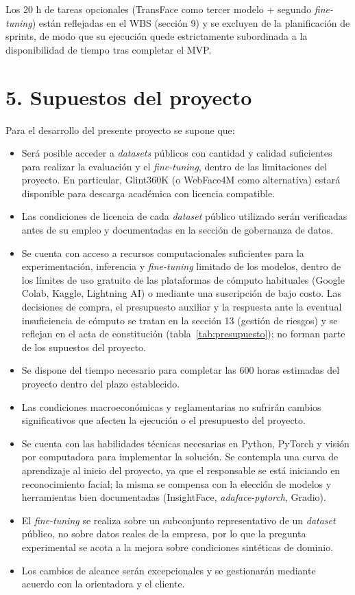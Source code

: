 \documentclass[
  11pt, %
]{charter}
\begin{document}
Los 20 h de tareas opcionales (TransFace como tercer modelo + segundo \textit{fine-tuning}) están reflejadas en el WBS (sección 9) y se excluyen de la planificación de sprints, de modo que su ejecución quede estrictamente subordinada a la disponibilidad de tiempo tras completar el MVP.

\section{5. Supuestos del proyecto}
\label{sec:supuestos}

Para el desarrollo del presente proyecto se supone que:

\begin{itemize}
  \item Será posible acceder a \textit{datasets} públicos con cantidad y calidad suficientes para realizar la evaluación y el \textit{fine-tuning}, dentro de las limitaciones del proyecto. En particular, Glint360K (o WebFace4M como alternativa) estará disponible para descarga académica con licencia compatible.
  \item Las condiciones de licencia de cada \textit{dataset} público utilizado serán verificadas antes de su empleo y documentadas en la sección de gobernanza de datos.
  \item Se cuenta con acceso a recursos computacionales suficientes para la experimentación, inferencia y \textit{fine-tuning} limitado de los modelos, dentro de los límites de uso gratuito de las plataformas de cómputo habituales (Google Colab, Kaggle, Lightning AI) o mediante una suscripción de bajo costo. Las decisiones de compra, el presupuesto auxiliar y la respuesta ante la eventual insuficiencia de cómputo se tratan en la sección 13 (gestión de riesgos) y se reflejan en el acta de constitución (tabla~\ref{tab:presupuesto}); no forman parte de los supuestos del proyecto.
  \item Se dispone del tiempo necesario para completar las 600 horas estimadas del proyecto dentro del plazo establecido.
  \item Las condiciones macroeconómicas y reglamentarias no sufrirán cambios significativos que afecten la ejecución o el presupuesto del proyecto.
  \item Se cuenta con las habilidades técnicas necesarias en Python, PyTorch y visión por computadora para implementar la solución. Se contempla una curva de aprendizaje al inicio del proyecto, ya que el responsable se está iniciando en reconocimiento facial; la misma se compensa con la elección de modelos y herramientas bien documentadas (InsightFace, \textit{adaface-pytorch}, Gradio).
  \item El \textit{fine-tuning} se realiza sobre un subconjunto representativo de un \textit{dataset} público, no sobre datos reales de la empresa, por lo que la pregunta experimental se acota a la mejora sobre condiciones sintéticas de dominio.
  \item Los cambios de alcance serán excepcionales y se gestionarán mediante acuerdo con la orientadora y el cliente.
\end{itemize}
\end{document}
